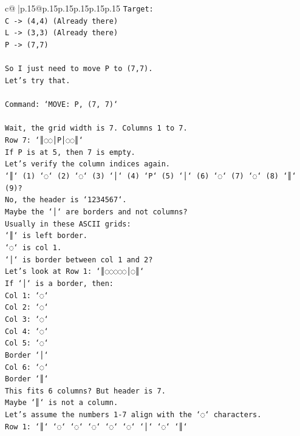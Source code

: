 \documentclass{article}
\begin{document}
{\begin{supertabular}{c@{$\;$}|p{.15\linewidth}@{}p{.15\linewidth}p{.15\linewidth}p{.15\linewidth}p{.15\linewidth}p{.15\linewidth}}
{{{\texttt{Target:} \\
\texttt{C {-}> (4,4) (Already there)} \\
\texttt{L {-}> (3,3) (Already there)} \\
\texttt{P {-}> (7,7)} \\
\\ 
\texttt{So I just need to move P to (7,7).} \\
\texttt{Let's try that.} \\
\\ 
\texttt{Command: `MOVE: P, (7, 7)`} \\
\\ 
\texttt{Wait, the grid width is 7. Columns 1 to 7.} \\
\texttt{Row 7: `║◌◌│P│◌◌║`} \\
\texttt{If P is at 5, then 7 is empty.} \\
\texttt{Let's verify the column indices again.} \\
\texttt{`║` (1) `◌` (2) `◌` (3) `│` (4) `P` (5) `│` (6) `◌` (7) `◌` (8) `║` (9)?} \\
\texttt{No, the header is `1234567`.} \\
\texttt{Maybe the `│` are borders and not columns?} \\
\texttt{Usually in these ASCII grids:} \\
\texttt{`║` is left border.} \\
\texttt{`◌` is col 1.} \\
\texttt{`│` is border between col 1 and 2?} \\
\texttt{Let's look at Row 1: `║◌◌◌◌◌│◌║`} \\
\texttt{If `│` is a border, then:} \\
\texttt{Col 1: `◌`} \\
\texttt{Col 2: `◌`} \\
\texttt{Col 3: `◌`} \\
\texttt{Col 4: `◌`} \\
\texttt{Col 5: `◌`} \\
\texttt{Border `│`} \\
\texttt{Col 6: `◌`} \\
\texttt{Border `║`} \\
\texttt{This fits 6 columns? But header is 7.} \\
\texttt{Maybe `║` is not a column.} \\
\texttt{Let's assume the numbers 1{-}7 align with the `◌` characters.} \\
\texttt{Row 1: `║` `◌` `◌` `◌` `◌` `◌` `│` `◌` `║`} \\
}}}
\end{supertabular}}
\end{document}
